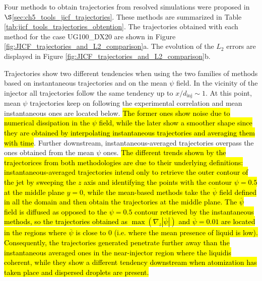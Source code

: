 Four methods to obtain trajectories from resolved simulations were proposed in $\S$\ref{sec:ch5_tools_jicf_trajectories}. These methods are summarized in Table \ref{tab:jicf_tools_trajectories_obtention}. The trajectories obtained with each method for the case UG100\_DX20 are shown in Figure \ref{fig:JICF_trajectories_and_L2_comparison}a. The evolution of the $L_2$ errors are displayed in Figure \ref{fig:JICF_trajectories_and_L2_comparison}b.

Trajectories show two different tendencies when using the two families of methods based on instantaneous trajectories and on the mean $\psi$ field. In the vicinity of the injector all trajectories follow the same tendency up to $x/d_\mathrm{inj} \sim 1$. At this point, mean $\psi$ trajectories keep on following the experimental correlation and mean instantaneous ones are located below. \hl{The former ones show noise due to numerical dissipation in the $\psi$ field, while the later show a smoother shape since they are obtained by interpolating instantaneous trajectories and averaging them with time}. Further downstream, instantaneous-averaged trajectories overpass the ones obtained from the mean $\psi$ ones. \hl{The different trends shown by the trajectorices from both methodologies are due to their underlying definitions: instantaneous-averaged trajectories intend only to retrieve the outer contour of the jet by sweeping the $z$ axis and identifying the points with the contour $\psi = 0.5$ at the middle plane $y = 0$, while the mean-based methods take the $\overline{\psi}$ field defined in all the domain and then obtain the trajectories at the middle plane. The $\overline{\psi}$ field is diffused as opposed to the $\psi = 0.5$ contour retrieved by the instantaneous methods, so the trajectories obtained as $\max \left( \nabla_z | \overline{\psi} | \right)$ and $\overline{\psi} = 0.01$ are located in the regions where $\overline{\psi}$ is close to $0$ (i.e. where the mean presence of liquid is low). Consequently, the trajectories generated penetrate further away than the instantaneous averaged ones in the near-injector region where the liquidis coherent, while they show a different tendency downstream when atomization has taken place and dispersed droplets are present.}



